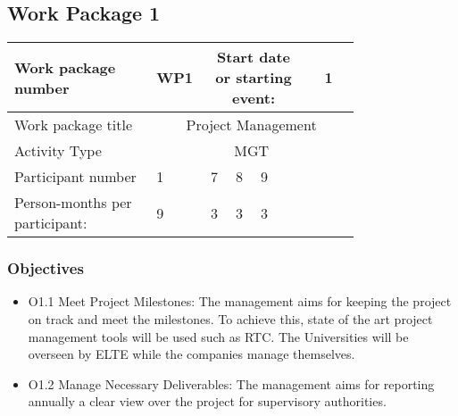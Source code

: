 \subsection{Work Package 1}

\begin{table}[hbpt]\centering
	\begin{tabular}{|p{0.35\linewidth}|p{0.06\linewidth}|p{0.06\linewidth}|p{0.06\linewidth}|
                     p{0.06\linewidth}|p{0.06\linewidth}|p{0.06\linewidth}|p{0.06\linewidth}|}\hline
		 Work package number& WP1 &
		 \multicolumn{4}{|c|}{Start date or starting event:}{}&
		 \multicolumn{2}{|c|}{                        1  }{}\\\hline
		 Work package title&\multicolumn{7}{|c|}{ Project Management }{}\\\hline
		 Activity Type&\multicolumn{7}{|c|}{ MGT }{}\\\hline
		 Participant number & 1 & 7 & 8 & 9 & ~ & ~ & ~ \\\hline
		 Person-months per participant: & 9 & 3 & 3 & 3 & ~ & ~ & ~ \\\hline
	\end{tabular}
\end{table}

\subsubsection{Objectives}
\begin{itemize}
	\item O1.1 Meet Project Milestones: The management aims for keeping the project on track and meet the milestones. To achieve this, state of the art project management tools will be used such as \gls{RTC}. The Universities will be overseen by ELTE while the companies manage themselves. 
	
	\item O1.2 Manage Necessary Deliverables: The management aims for reporting annually a clear view over the project for supervisory authorities.  
\end{itemize}

